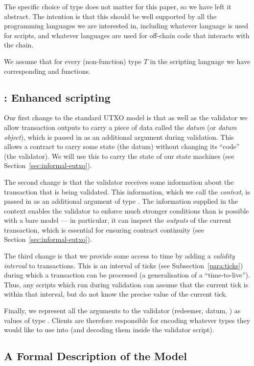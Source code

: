 The specific choice of type does not matter for this paper, so we have left it
abstract. The intention is that this should
be well supported by all the programming languages we are interested in,
including whatever language is used for scripts, and whatever languages
are used for off-chain code that interacts with the chain.

We assume that for every (non-function) type $T$ in the scripting
language we have corresponding \toData{} and \fromData{} functions.

\subsection{\EUTXO{}: Enhanced scripting}
\label{sec:eutxo}
Our first change to the standard UTXO model is that as well as the
validator we allow transaction outputs to carry a piece of data called
the \emph{datum} (or \emph{datum object}), which is passed in as an
additional argument during validation.  This allows a contract to
carry some state (the datum) without changing its ``code'' (the
validator). We will use this to carry the state of our state machines
(see Section~\ref{sec:informal-eutxo}).

The second change is that the validator receives some information
about the transaction that is being validated. This information, which
we call the \textit{context}, is passed in as an additional
argument of type \ctx{}. The information supplied in the
context enables the validator to enforce much stronger conditions than
is possible with a bare \UTXO{} model --- in particular, it can
inspect the \emph{outputs} of the current transaction, which is
essential for ensuring contract continuity (see
Section~\ref{sec:informal-eutxo}).

The third change is that we provide some access to time by adding a
\emph{validity interval} to transactions.
This is an interval of ticks (see Subsection~\ref{para:ticks})
during which a transaction can be processed (a generalisation of a ``time-to-live'').
Thus, any scripts which run during validation can assume that the current tick
is within that interval, but do not know the precise value of the current tick.

Finally, we represent all the arguments to the validator (redeemer, datum,
\ctx) as values of type \Data{}. Clients are therefore responsible for encoding
whatever types they would like to use into \Data{} (and decoding them inside the
validator script).

\subsection{A Formal Description of the \EUTXO{} Model}
\label{section:eutxo-spec}


